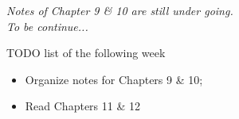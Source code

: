 \documentclass[working]{article}
\begin{document}




\textit{Notes of Chapter 9 \& 10 are still under going.\\
To be continue...}

\begin{framed}{\large
TODO list of the following week
\begin{itemize}
    \item Organize notes for Chapters 9 \& 10;
    \item Read Chapters 11 \& 12
\end{itemize}
}
\end{framed}




% 






\listnotes

\end{document}
